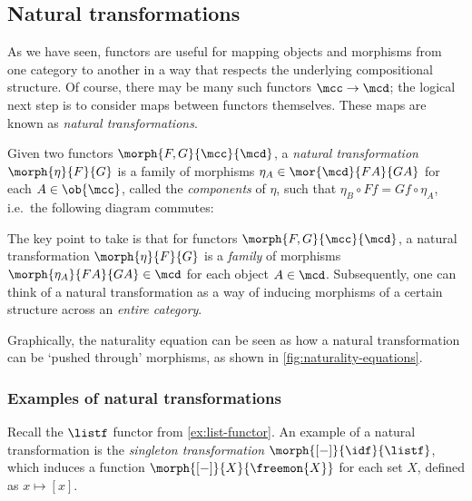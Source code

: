 \subsection{Natural transformations}

As we have seen, functors are useful for mapping objects and morphisms from one
category to another in a way that respects the underlying compositional
structure.
Of course, there may be many such functors \(\mcc \to \mcd\); the logical next
step is to consider maps between functors themselves.
These maps are known as \emph{natural transformations}.

\begin{definition}
    Given two functors \(\morph{F, G}{\mcc}{\mcd}\), a
    \emph{natural transformation} \(\morph{\eta}{F}{G}\) is a family of
    morphisms \(
        \eta_A \in \mor{\mcd}{FA}{GA}
    \) for each \(A \in \ob{\mcc}\), called the \emph{components} of \(\eta\),
    such that \(
        \eta_B \circ Ff = Gf \circ \eta_A
    \), i.e.\ the following diagram commutes:
    \begin{center}
        
    \end{center}
\end{definition}

The key point to take is that for functors \(\morph{F,G}{\mcc}{\mcd}\), a
natural transformation \(\morph{\eta}{F}{G}\) is a \emph{family} of morphisms
\(\morph{\eta_A}{FA}{GA} \in \mcd\) for each object \(A \in \mcd\).
Subsequently, one can think of a natural transformation as a way of inducing
morphisms of a certain structure across an \emph{entire category}.

Graphically, the naturality equation can be seen as how a natural transformation
can be `pushed through' morphisms, as shown in \cref{fig:naturality-equations}.



\subsubsection{Examples of natural transformations}

\begin{example}[Singleton]
    Recall the \(\listf\) functor from \cref{ex:list-functor}.
    An example of a natural transformation is the
    \emph{singleton transformation} \(\morph{[-]}{\idf}{\listf}\), which
    induces a function \(\morph{[-]}{X}{\freemon{X}}\) for each set \(X\),
    defined as \(x \mapsto [x]\).
\end{example}

